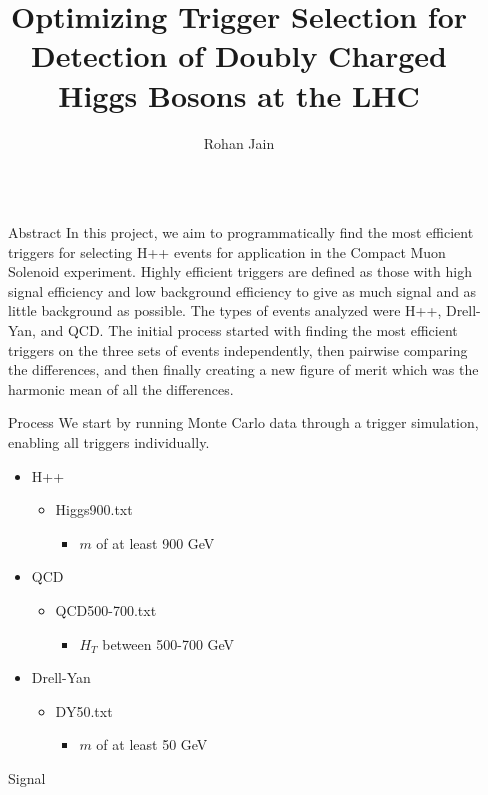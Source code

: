 \documentclass[final]{beamer}
\title{Optimizing Trigger Selection for Detection of Doubly Charged Higgs Bosons at the LHC}
\author{Rohan Jain}
\institute[shortinst]{ {\texttt{rjain@imsa.edu} \\

Illinois Mathematics and Science Academy
}}
\newlength{\sepwidth}
\newlength{\colwidth}
\newcommand{\separatorcolumn}{\begin{column}{\sepwidth}\end{column}}
\begin{document}
\begin{frame}[t]
\begin{columns}[t]
\separatorcolumn

\begin{column}{\colwidth}
  \begin{block}{Abstract}
    In this project, we aim to programmatically find the most efficient triggers for selecting H++ events for application in the Compact Muon Solenoid experiment. Highly efficient triggers are defined as those with high signal efficiency and low background efficiency to give as much signal and as little background as possible. The types of events analyzed were H++, Drell-Yan, and QCD. The initial process started with finding the most efficient triggers on the three sets of events independently, then pairwise comparing the differences, and then finally creating a new figure of merit which was the harmonic mean of all the differences. 
  \end{block}
  \begin{block}{Process}
    We start by running Monte Carlo data through a trigger simulation, enabling all triggers individually.
    \begin{itemize}
        \item H++
        \begin{itemize}
            \item Higgs900.txt
            \begin{itemize}
                \item $m$ of at least 900 GeV
            \end{itemize}
        \end{itemize}
        \item QCD
        \begin{itemize}
            \item QCD500-700.txt
            \begin{itemize}
                \item $H_T$ between 500-700 GeV
            \end{itemize}
        \end{itemize}
        \item Drell-Yan
        \begin{itemize}
            \item DY50.txt
            \begin{itemize}
                \item $m$ of at least 50 GeV
            \end{itemize}
        \end{itemize}
    \end{itemize}
  \end{block}
  \begin{block}{Signal}
    

\end{block}
\end{column}
\end{columns}
\end{frame}
\end{document}
